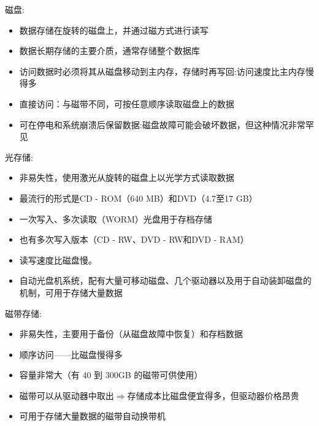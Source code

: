 磁盘:

\begin{itemize}
    \item 数据存储在旋转的磁盘上，并通过磁方式进行读写
    \item 数据⻓期存储的主要介质，通常存储整个数据库
    \item 访问数据时必须将其从磁盘移动到主内存，存储时再写回:访问速度比主内存慢得多
    \item 直接访问：与磁带不同，可按任意顺序读取磁盘上的数据
    \item 可在停电和系统崩溃后保留数据:磁盘故障可能会破坏数据，但这种情况非常罕⻅
\end{itemize}

光存储:

\begin{itemize}
    \item 非易失性，使用激光从旋转的磁盘上以光学方式读取数据
    \item 最流行的形式是CD - ROM（640 MB）和DVD（4.7至17 GB）
    \item 一次写入、多次读取（WORM）光盘用于存档存储
    \item 也有多次写入版本（CD - RW、DVD - RW和DVD - RAM）
    \item 读写速度比磁盘慢。
    \item 自动光盘机系统，配有大量可移动磁盘、几个驱动器以及用于自动装卸磁盘的机制，可用于存储大量数据
\end{itemize}

磁带存储:

\begin{itemize}
    \item 非易失性，主要用于备份（从磁盘故障中恢复）和存档数据
    \item 顺序访问——比磁盘慢得多
    \item 容量非常大（有 40 到 300GB 的磁带可供使用）
    \item 磁带可以从驱动器中取出$\Longrightarrow$存储成本比磁盘便宜得多，但驱动器价格昂贵
    \item 可用于存储大量数据的磁带自动换带机
\end{itemize}